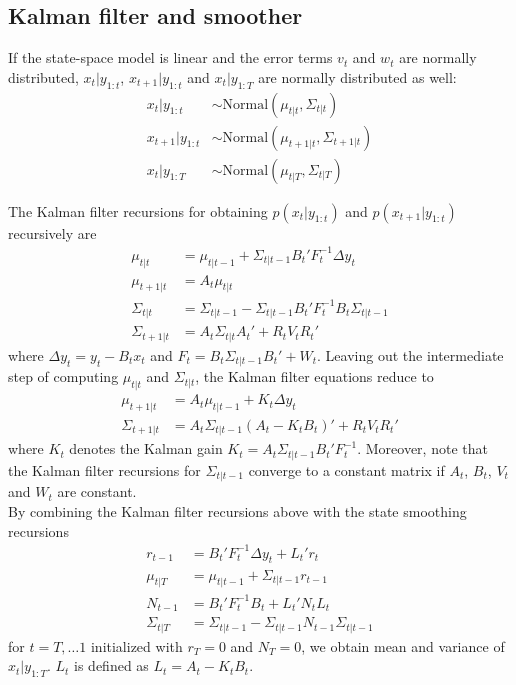 \documentclass[12pt,a4paper]{scrartcl}
\begin{document}
\subsection{Kalman filter and smoother}

If the state-space model is linear and the error terms $v_t$ and $w_t$ are normally distributed, $x_t|y_{1:t}$, $x_{t+1}|y_{1:t}$ and $x_t|y_{1:T}$ are normally distributed as well:
\begin{align*}
x_t|y_{1:t} &\sim \mathrm{Normal}(\mu_{t|t}, \Sigma_{t|t}) \\
x_{t+1}|y_{1:t} &\sim \mathrm{Normal}(\mu_{t+1|t}, \Sigma_{t+1|t}) \\
x_t|y_{1:T} &\sim \mathrm{Normal}(\mu_{t|T}, \Sigma_{t|T})
\end{align*}

The Kalman filter recursions for obtaining $p(x_t|y_{1:t})$ and $p(x_{t+1}|y_{1:t})$ recursively are
\begin{align*}
\mu_{t|t} &= \mu_{t|t-1} + \Sigma_{t|t-1}B_t'F_t^{-1}\Delta y_t\\
\mu_{t+1|t} &= A_t\mu_{t|t}\\
\Sigma_{t|t} &= \Sigma_{t|t-1} - \Sigma_{t|t-1}B_t'F_t^{-1}B_t\Sigma_{t|t-1}\\
\Sigma_{t+1|t} &= A_t\Sigma_{t|t}A_t' + R_t V_t R_t'
\end{align*}
where $\Delta y_t = y_t - B_t x_t$ and $F_t = B_t\Sigma_{t|t-1}B_t' + W_t$. Leaving out the intermediate step of computing $\mu_{t|t}$ and $\Sigma_{t|t}$, the Kalman filter equations reduce to
\begin{align*}
\mu_{t+1|t} &= A_t\mu_{t|t-1} + K_t\Delta y_t \\
\Sigma_{t+1|t} &= A_t \Sigma_{t|t-1}(A_t - K_t B_t)' + R_t V_t R_t'
\end{align*}
where $K_t$ denotes the Kalman gain $K_t=A_t\Sigma_{t|t-1}B_t'F_t^{-1}$. Moreover, note that the Kalman filter recursions for $\Sigma_{t|t-1}$ converge to a constant matrix if $A_t$, $B_t$, $V_t$ and $W_t$ are constant.\\

By combining the Kalman filter recursions above with the state smoothing recursions
\begin{align*}
r_{t-1} &= B_t'F_t^{-1}\Delta y_t + L_t'r_t \\
\mu_{t|T} &= \mu_{t|t-1} + \Sigma_{t|t-1}r_{t-1} \\
N_{t-1} &= B_t'F_t^{-1}B_t + L_t' N_t L_t \\
\Sigma_{t|T} &= \Sigma_{t|t-1} - \Sigma_{t|t-1}N_{t-1}\Sigma_{t|t-1}
\end{align*}
for $t=T, \dots 1$ initialized with $r_T = 0$ and $N_T=0$, we obtain mean and variance of $x_t|y_{1:T}$. $L_t$ is defined as $L_t = A_t - K_t B_t$.\\
\end{document}
